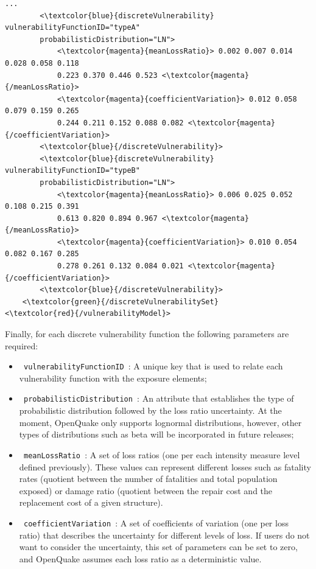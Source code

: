 \begin{Verbatim}[frame=single, commandchars=\\\{\}, samepage=true]
        ...
        <\textcolor{blue}{discreteVulnerability}  vulnerabilityFunctionID="typeA" 
        probabilisticDistribution="LN">
            <\textcolor{magenta}{meanLossRatio}> 0.002 0.007 0.014 0.028 0.058 0.118
            0.223 0.370 0.446 0.523 <\textcolor{magenta}{/meanLossRatio}>
            <\textcolor{magenta}{coefficientVariation}> 0.012 0.058 0.079 0.159 0.265 
            0.244 0.211 0.152 0.088 0.082 <\textcolor{magenta}{/coefficientVariation}>
        <\textcolor{blue}{/discreteVulnerability}>
        <\textcolor{blue}{discreteVulnerability}  vulnerabilityFunctionID="typeB" 
        probabilisticDistribution="LN">
            <\textcolor{magenta}{meanLossRatio}> 0.006 0.025 0.052 0.108 0.215 0.391	
            0.613 0.820 0.894 0.967 <\textcolor{magenta}{/meanLossRatio}>
            <\textcolor{magenta}{coefficientVariation}> 0.010 0.054 0.082 0.167 0.285 
            0.278 0.261 0.132 0.084 0.021 <\textcolor{magenta}{/coefficientVariation}>
        <\textcolor{blue}{/discreteVulnerability}>
    <\textcolor{green}{/discreteVulnerabilitySet} 
<\textcolor{red}{/vulnerabilityModel}>        
\end{Verbatim}

Finally, for each discrete vulnerability function the following parameters are required:
\begin{itemize}
\item  \Verb+ vulnerabilityFunctionID +: A unique key that is used to relate each vulnerability function with the exposure elements;
\item  \Verb+ probabilisticDistribution +: An attribute that establishes the type of probabilistic distribution followed by the loss ratio uncertainty. At the moment, OpenQuake only supports lognormal distributions, however, other types of distributions such as beta will be incorporated in future releases;
\item  \Verb+ meanLossRatio +: A set of loss ratios (one per each intensity measure level defined previously). These values can represent different losses such as fatality rates (quotient between the number of fatalities and total population exposed) or damage ratio (quotient between the repair cost and the replacement cost of a given structure).
\item  \Verb+ coefficientVariation +: A set of coefficients of variation (one per loss ratio) that describes the uncertainty for different levels of loss. If users do not want to consider the uncertainty, this set of parameters can be set to zero, and OpenQuake assumes each loss ratio as a deterministic value. 
\end{itemize}
